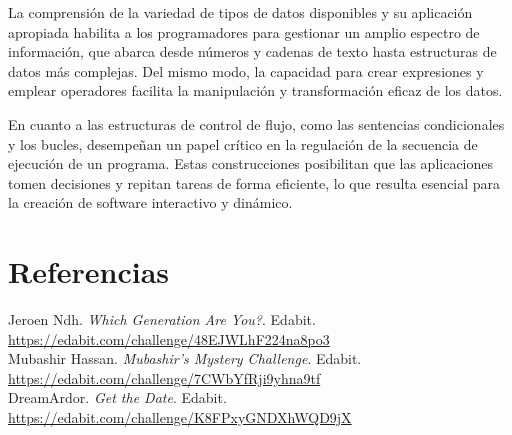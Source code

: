 \documentclass[11pt, twocolumn]{article}
\begin{document}
  La comprensión de la variedad de tipos de datos disponibles y su aplicación apropiada habilita a los programadores para gestionar un amplio espectro de información, que abarca desde números y cadenas de texto hasta estructuras de datos más complejas. Del mismo modo, la capacidad para crear expresiones y emplear operadores facilita la manipulación y transformación eficaz de los datos.

  En cuanto a las estructuras de control de flujo, como las sentencias condicionales y los bucles, desempeñan un papel crítico en la regulación de la secuencia de ejecución de un programa. Estas construcciones posibilitan que las aplicaciones tomen decisiones y repitan tareas de forma eficiente, lo que resulta esencial para la creación de software interactivo y dinámico.

  \section*{Referencias}
  \small
  Jeroen Ndh. \textit{Which Generation Are You?}. Edabit. \url{https://edabit.com/challenge/48EJWLhF224na8po3} \\

  Mubashir Hassan. \textit{Mubashir's Mystery Challenge}. Edabit. \url{https://edabit.com/challenge/7CWbYfRji9yhna9tf} \\

  DreamArdor. \textit{Get the Date}. Edabit. \url{https://edabit.com/challenge/K8FPxyGNDXhWQD9jX}
\end{document}
